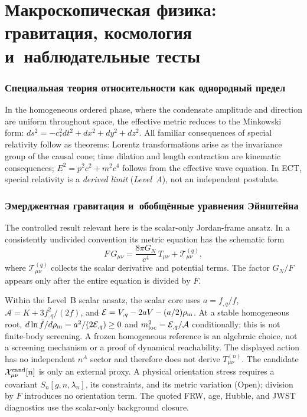 \documentclass[11pt,a4paper]{article}
\begin{document}
\newpage
\part{Макроскопическая физика: гравитация, космология и~наблюдательные тесты}
\label{part:macro_pop}

\section{Специальная теория относительности как однородный предел}

In the homogeneous ordered phase, where the condensate amplitude and direction are uniform throughout space, the effective metric reduces to the Minkowski form: $ds^2 = -c_*^2 dt^2 + dx^2 + dy^2 + dz^2$. All familiar consequences of special relativity follow as theorems: Lorentz transformations arise as the invariance group of the causal cone; time dilation and length contraction are kinematic consequences; $E^2 = p^2c^2 + m^2c^4$ follows from the effective wave equation. In ECT, special relativity is a \emph{derived limit} (\emph{Level~A}), not an independent postulate.


\section{Эмерджентная гравитация и~обобщённые уравнения Эйнштейна}
\label{sec:pop_gravity}

The controlled result relevant here is the scalar-only Jordan-frame ansatz.  In a consistently undivided convention its metric equation has the schematic form
\begin{equation}
  F\,G_{\mu\nu}
  = \frac{8\pi G_N}{c^4}\,T_{\mu\nu}
    + \mathcal{T}^{(q)}_{\mu\nu},
  \label{eq:pop_gee}
\end{equation}
where $\mathcal{T}^{(q)}_{\mu\nu}$ collects the scalar derivative and potential terms.  The factor $G_N/F$ appears only after the entire equation is divided by $F$.

Within the Level~B scalar ansatz, the scalar core uses $a=f_{,q}/f$, $\mathcal A=K+3f_{,q}^2/(2f)$, and $\mathcal E=V_{,q}-2aV-(a/2)\rho_{\rm m}$.  At a stable homogeneous root, $d\ln\bar f/d\rho_{\rm m}=a^2/(2\mathcal E_{,q})\ge0$ and $m_{\rm loc}^2=\mathcal E_{,q}/\mathcal A$ conditionally; this is not finite-body screening.  A frozen homogeneous reference is an algebraic choice, not a screening mechanism or a proof of dynamical reachability.  The displayed action has no independent $n^A$ sector and therefore does not derive $T^{(n)}_{\mu\nu}$.  The candidate $\mathcal X^{\rm cand}_{\mu\nu}[n]$ is only an external proxy.  A physical orientation stress requires a covariant $S_n[g,n,\lambda_n]$, its constraints, and its metric variation (Open); division by $F$ introduces no orientation term.  The quoted FRW, age, Hubble, and JWST diagnostics use the scalar-only background closure.
\end{document}
